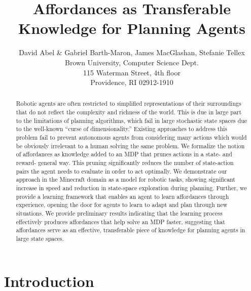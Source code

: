 \documentclass[letterpaper]{article}
\begin{document}

\title{Affordances as Transferable Knowledge for Planning Agents}
\author{David Abel \& Gabriel Barth-Maron, James MacGlashan, Stefanie Tellex\\
Brown University, Computer Science Dept. \\
115 Waterman Street, 4th floor \\
Providence, RI 02912-1910}


\maketitle
\begin{abstract}
Robotic agents are often restricted to simplified representations of their surroundings
that do not reflect the complexity and richness of the world. This is due in large part to the limitations
of planning algorithms, which fail in large stochastic state spaces due to the well-known ``curse of
dimensionality.'' Existing approaches to address this problem fail to
prevent autonomous agents from considering many actions which would be
obviously irrelevant to a human solving the same problem. We formalize the notion of affordances
as knowledge added to an MDP that prunes actions in a state- and reward- general
way. This pruning significantly reduces the number of state-action
pairs the agent needs to evaluate in order to act optimally. We
demonstrate our approach in the Minecraft domain as a model for robotic tasks, showing significant
increase in speed and reduction in state-space exploration during planning. Further, we provide a
learning framework that enables an agent to learn affordances through
experience, opening the door for agents to learn to adapt and plan through new situations. We provide
preliminary results indicating that the learning process effectively
produces affordances that help solve an MDP faster, suggesting that affordances
serve as an effective, transferable piece of knowledge for planning agents in 
large state spaces.
\end{abstract}

\section{Introduction}
\label{sec:introduction}
\end{document}
